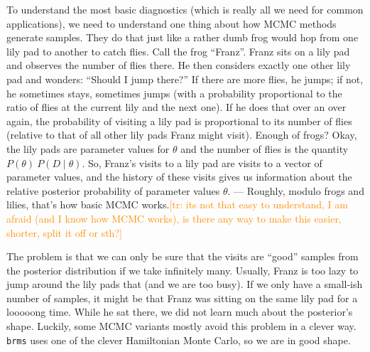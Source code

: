 \documentclass[nobib]{tufte-handout}
\newcommand{\tr}[1]{\textcolor{DarkOrange}{[tr: #1]}}
\begin{document}
\begin{InfoBox}[]
{\begin{minipage}{1\textwidth}
    To understand the most basic diagnostics (which is really all we need for common applications), we need to understand one thing about how MCMC methods generate
    samples. They do that just like a rather dumb frog would hop from one lily pad to another
    to catch flies. Call the frog ``Franz''. Franz sits on a
    lily pad and observes the number of flies there. He then considers exactly one other lily
    pad and wonders: ``Should I jump there?'' If there are more flies, he jumps; if
    not, he sometimes stays, sometimes jumps (with a probability proportional to the ratio of
    flies at the current lily and the next one). If he does that over an over again, the probability of visiting a
    lily pad is proportional to its number of flies (relative to that of all other lily pads
    Franz might visit). Enough of frogs? Okay, the lily pads are parameter values for
    $\theta$ and the number of flies is the quantity $P(\theta) \ P(D \mid \theta)$. So,
    Franz's visits to a lily pad are visits to a vector of parameter values, and
    the history of these visits gives us information about the relative posterior probability
    of parameter values $\theta$. --- Roughly, modulo frogs and lilies, that's how basic MCMC
    works.\tr{its not that easy to understand, I am afraid (and I know how MCMC works), is there any way to make this easier, shorter, split it off or sth?}

    The problem is that we can only be sure that the visits are ``good'' samples from the posterior
    distribution if we take infinitely many. Usually, Franz is too lazy to jump around the lily pads that  (and we are too busy). If we only have a small-ish number of samples, it might be that
    Franz was sitting on the same lily pad for a looooong time. While he
    sat there, we did not learn much about the posterior's shape. Luckily, some MCMC variants mostly avoid this problem in a clever way. \texttt{brms} uses one of the clever Hamiltonian Monte Carlo, so we are in good shape.
    

\end{minipage}}
\end{InfoBox}
\end{document}
